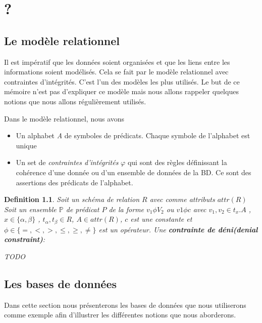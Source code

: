 \documentclass[letterpaper, 12pt]{report}
\newtheorem{mydef}{Definition}
\newcommand{\alinea}{
\hspace*{0.5cm}}
\begin{document}
\chapter{?}

\section{Le modèle relationnel}


\alinea Il est impératif que les données soient organisées et que les liens entre les informations soient modélisés. Cela se fait par le modèle relationnel avec contraintes d'intégrités. C'est l'un des modèles les plus utilisés. Le but de ce mémoire n'est pas d'expliquer ce modèle mais nous allons rappeler quelques notions que nous allons régulièrement utilisés.

Dans le modèle relationnel, nous avons \cite{Integrity}
\begin{itemize}
\item Un alphabet \emph{A} de symboles de prédicats. Chaque symbole de l'alphabet est unique
\item Un set de \emph{contraintes d'intégrités}  $\varphi$ qui sont des règles définissant la cohérence d'une donnée ou d'un ensemble de données de la BD. Ce sont des assertions des prédicats de l'alphabet.
\end{itemize}

\begin{mydef}
Soit un schéma de relation $R$ avec comme attributs $attr(R)$ Soit un ensemble $\mathbb{P}$ de prédicat $P$ de la forme $v_1 \phi V_2$ ou $v1 \phi c$ avec $v_1,v_2 \in t_x.A$ , $x \in \{\alpha,\beta\}$ , $t_\alpha,t_\beta \in R$, $A \in attr(R)$, $c$ est une constante et $\phi \in \{ =,<,>,\leq, \geq, \neq \}$ est un opérateur.  Une \textbf{contrainte de déni(denial constraint)}\cite{main}:

TODO
\end{mydef}
%

\section{Les bases de données}
Dans cette section nous présenterons les bases de données que nous utiliserons comme exemple afin d'illustrer les différentes notions que nous aborderons.
\end{document}
